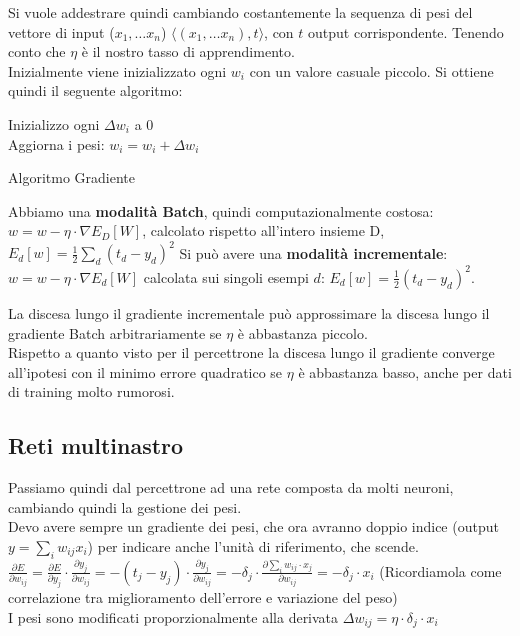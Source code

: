 Si vuole addestrare quindi cambiando costantemente la sequenza di pesi del vettore di input ($x_1, \dots x_n$) $\langle( x_1, \ldots x_n),t\rangle$, con $t$ output corrispondente. Tenendo conto che $\eta$ è il nostro tasso di apprendimento. \\
Inizialmente viene inizializzato ogni $w_i$ con un valore casuale piccolo. Si ottiene quindi il seguente algoritmo: 

\begin{algorithm}[H]
    \SetAlgoLined
    \textnormal{Inizializzo ogni} $\Delta w_i$ \textnormal{ a 0} \\
   Aggiorna i pesi: $w_i=w_i+\Delta w_i$
   \caption{Algoritmo Gradiente}
\end{algorithm}

Abbiamo una \textbf{modalità Batch}, quindi computazionalmente costosa: $w=w-\eta\cdot\nabla E_D[W]$, calcolato rispetto all'intero insieme D, $\displaystyle E_d[w]=\frac{1}{2}\sum_d(t_d-y_d)^2$ Si può avere una \textbf{modalità incrementale}: $\displaystyle w=w-\eta\cdot\nabla E_d[W]$ calcolata sui singoli esempi $d$: $\displaystyle E_d[w]=\frac{1}{2}(t_d-y_d)^2$.

La discesa lungo il gradiente incrementale può approssimare la discesa lungo il gradiente Batch arbitrariamente se $\eta$ è abbastanza piccolo.\\ 
Rispetto a quanto visto per il percettrone la discesa lungo il gradiente converge all'ipotesi con il minimo errore quadratico se  $\eta$ è abbastanza basso, anche per dati di training molto rumorosi.

\subsection{Reti multinastro}

Passiamo quindi dal percettrone ad una rete composta da molti neuroni, cambiando quindi la
gestione dei pesi.\\ 
Devo avere sempre un gradiente dei pesi, che ora avranno doppio indice (output $y= \sum_i w_{ij}x_i$) per indicare anche l'unità di riferimento, che scende.
$\displaystyle \frac{\partial E}{\partial w_{ij}}=\frac{\partial E}{\partial y_{j}}\cdot \frac{\partial y_j}{\partial w_{ij}}=-(t_j-y_j)\cdot \frac{\partial y_j}{\partial w_{ij}}=-\delta_j\cdot\frac{\partial \sum_i w_{ij}\cdot x_j}{\partial w_{ij}}=-\delta_j\cdot x_i$ 
(Ricordiamola come correlazione tra miglioramento dell'errore e variazione del peso)
\\
I pesi sono modificati proporzionalmente alla derivata $\Delta w_{ij} = \eta \cdot \delta_j \cdot x_i$


